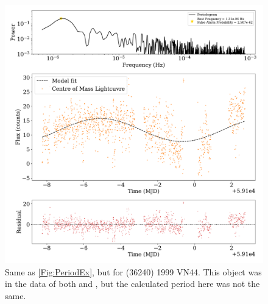 \documentclass{UCreport}
\begin{document}
\begin{figure}
  \centering
  \includegraphics[width = \textwidth]{Figures/Periodogram1999 VN44Resid.pdf}
  \caption[(36240) 1999 VN44 Periodogram]{Same as \autoref{Fig:PeriodEx}, but for (36240) 1999 VN44.
  This object was in the data of both \citet{Pal2020} and \citet{McNeill2023}, but the calculated period here was not the same.}
  \label{ApFig:1999VN44}
\end{figure}

\newpage
% 

\end{document}
